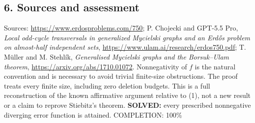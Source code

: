 \subsection*{6. Sources and assessment}
Sources: \url{https://www.erdosproblems.com/750}; P. Chojecki and GPT-5.5 Pro, \emph{Local odd-cycle transversals in generalized Mycielski graphs and an Erd\H{o}s problem on almost-half independent sets}, \url{https://www.ulam.ai/research/erdos750.pdf}; T. M\"uller and M. Stehl\'ik, \emph{Generalised Mycielski graphs and the Borsuk--Ulam theorem}, \url{https://arxiv.org/abs/1710.01072}.
Nonnegativity of $f$ is the natural convention and is necessary to avoid trivial finite-size obstructions. The proof treats every finite size, including zero deletion budgets. This is a full reconstruction of the known affirmative argument relative to (1), not a new result or a claim to reprove Stiebitz's theorem.
\textbf{SOLVED:} every prescribed nonnegative diverging error function is attained.
\noindent COMPLETION: 100\%
